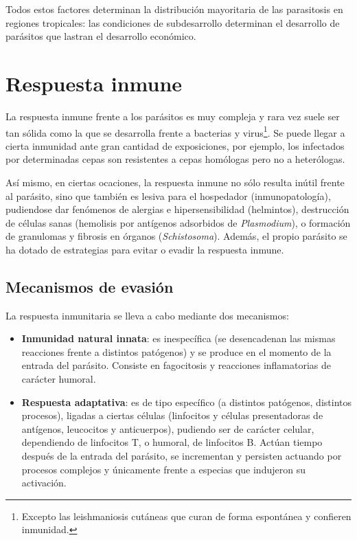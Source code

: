\documentclass[10pt,a4paper,onecolumn,openany]{book}
\begin{document}
Todos estos factores determinan la distribución mayoritaria de las parasitosis en regiones tropicales: las condiciones de subdesarrollo determinan el desarrollo de parásitos que lastran el desarrollo económico.
\section{Respuesta inmune}
La respuesta inmune frente a los parásitos es muy compleja y rara vez suele ser tan sólida como la que se desarrolla frente a bacterias y virus\footnote{Excepto las leishmaniosis cutáneas que curan de forma espontánea y confieren inmunidad.}. Se puede llegar a cierta inmunidad ante gran cantidad de exposiciones, por ejemplo, los infectados por determinadas cepas son resistentes a cepas homólogas pero no a heterólogas.

Así mismo, en ciertas ocaciones, la respuesta inmune no sólo resulta inútil frente al parásito, sino que también es lesiva para el hospedador (inmunopatología), pudiendose dar fenómenos de alergias e hipersensibilidad (helmintos), destrucción de células sanas (hemolisis por antígenos adsorbidos de \textit{Plasmodium}), o formación de granulomas y fibrosis en órganos (\textit{Schistosoma}). Además, el propio parásito se ha dotado de estrategias para evitar o evadir la respuesta inmune.
\subsection{Mecanismos de evasión}
La respuesta inmunitaria se lleva a cabo mediante dos mecanismos:
\begin{itemize}[itemsep=0pt,parsep=0pt,topsep=0pt,partopsep=0pt]
	\item \textbf{Inmunidad natural innata}: es inespecífica (se desencadenan las mismas reacciones frente a distintos patógenos) y se produce en el momento de la entrada del parásito. Consiste en fagocitosis y reacciones inflamatorias de carácter humoral.
	\item\textbf{Respuesta adaptativa}: es de tipo específico (a distintos patógenos, distintos procesos), ligadas a ciertas células (linfocitos y células presentadoras de antígenos, leucocitos y anticuerpos), pudiendo ser de carácter celular, dependiendo de linfocitos T, o humoral, de linfocitos B. Actúan tiempo después de la entrada del parásito, se incrementan y persisten actuando por procesos complejos y únicamente frente a especias que indujeron su activación.
\end{itemize}
\end{document}
